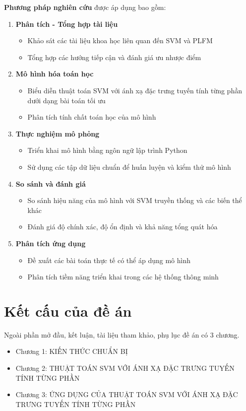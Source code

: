 \textbf{Phương pháp nghiên cứu} được áp dụng bao gồm:
\begin{enumerate}
\item \textbf{Phân tích - Tổng hợp tài liệu}
\begin{itemize}
    \item Khảo sát các tài liệu khoa học liên quan đến SVM và PLFM
    \item Tổng hợp các hướng tiếp cận và đánh giá ưu nhược điểm
\end{itemize}

\item \textbf{Mô hình hóa toán học}
\begin{itemize}
    \item Biểu diễn thuật toán SVM với ánh xạ đặc trưng tuyến tính từng phần dưới dạng bài toán tối ưu
    \item Phân tích tính chất toán học của mô hình
\end{itemize}

\item \textbf{Thực nghiệm mô phỏng}
\begin{itemize}
    \item Triển khai mô hình bằng ngôn ngữ lập trình Python
    \item Sử dụng các tập dữ liệu chuẩn để huấn luyện và kiểm thử mô hình
\end{itemize}

\item \textbf{So sánh và đánh giá}
\begin{itemize}
    \item So sánh hiệu năng của mô hình với SVM truyền thống và các biến thể khác
    \item Đánh giá độ chính xác, độ ổn định và khả năng tổng quát hóa
\end{itemize}

\item \textbf{Phân tích ứng dụng}
\begin{itemize}
    \item Đề xuất các bài toán thực tế có thể áp dụng mô hình
    \item Phân tích tiềm năng triển khai trong các hệ thống thông minh
\end{itemize}
\end{enumerate}

\section*{Kết cấu của đề án}
Ngoài phần mở đầu, kết luận, tài liệu tham khảo, phụ lục đề án có 3 chương.
\begin{itemize}
    \item[-] Chương 1: KIẾN THỨC CHUẨN BỊ
    \item[-] Chương 2: THUẬT TOÁN SVM VỚI ÁNH XẠ ĐẶC TRƯNG TUYẾN TÍNH TỪNG PHẦN
    \item[-] Chương 3: ỨNG DỤNG CỦA THUẬT TOÁN SVM VỚI ÁNH XẠ ĐẶC TRƯNG TUYẾN TÍNH TỪNG PHẦN
\end{itemize}